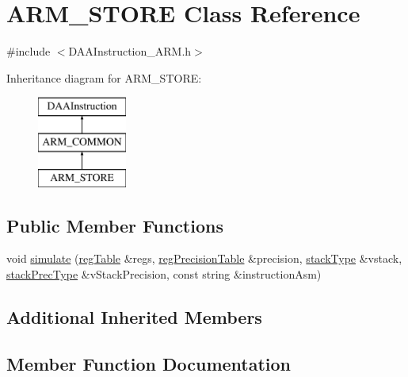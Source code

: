 \hypertarget{classARM__STORE}{}\section{A\+R\+M\+\_\+\+S\+T\+O\+RE Class Reference}
\label{classARM__STORE}


{\ttfamily \#include $<$D\+A\+A\+Instruction\+\_\+\+A\+R\+M.\+h$>$}

Inheritance diagram for A\+R\+M\+\_\+\+S\+T\+O\+RE\+:\begin{figure}[H]
\begin{center}
\leavevmode
\includegraphics[height=3.000000cm]{classARM__STORE}
\end{center}
\end{figure}
\subsection*{Public Member Functions}
\begin{DoxyCompactItemize}
\item 
void \hyperlink{classARM__STORE_a0db5283c3bda82c617f3d2e541ad0982}{simulate} (\hyperlink{DAAInstruction_8h_af0fae93a861de9cf37988d5673cac523}{reg\+Table} \&regs, \hyperlink{DAAInstruction_8h_a0e8cae02815a5f8adc750122d790b455}{reg\+Precision\+Table} \&precision, \hyperlink{DAAInstruction_8h_a1b0e70ac1a04f06c8132055ed01f589f}{stack\+Type} \&vstack, \hyperlink{DAAInstruction_8h_ac5cb793e9dac3fa9693da78b7e29ab30}{stack\+Prec\+Type} \&v\+Stack\+Precision, const string \&instruction\+Asm)
\end{DoxyCompactItemize}
\subsection*{Additional Inherited Members}


\subsection{Member Function Documentation}
\mbox{\label{classARM__STORE_a0db5283c3bda82c617f3d2e541ad0982}} 
